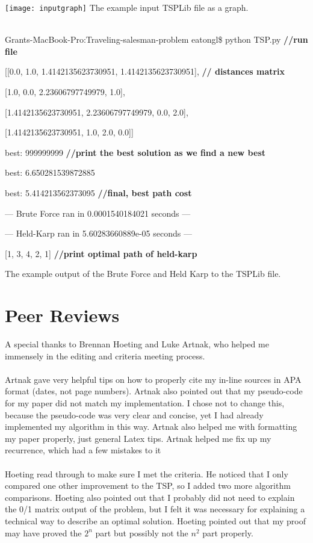 \documentclass[a4paper,titlepage, margin, 11pt]{article}
\numberwithin{equation}{section}
\begin{document}
\begin{appendices}
\begin{center}
\texttt{[image: inputgraph]}
The example input TSPLib file as a graph.
\end{center}


\newpage

\\
Grants-MacBook-Pro:Traveling-salesman-problem eatongl\$ python TSP.py   \textbf{//run file}

[[0.0, 1.0, 1.4142135623730951, 1.4142135623730951], \textbf{// distances matrix}

 [1.0, 0.0, 2.23606797749979, 1.0], 

[1.4142135623730951, 2.23606797749979, 0.0, 2.0], 

[1.4142135623730951, 1.0, 2.0, 0.0]]

best: 999999999 \textbf{//print the best solution as we find a new best}

best: 6.650281539872885

best:  5.414213562373095 \textbf{//final, best path cost}

--- Brute Force ran in 0.0001540184021 seconds ---

--- Held-Karp ran in 5.60283660889e-05 seconds ---

[1, 3, 4, 2, 1] \textbf{//print optimal path of held-karp}

\begin{center}
The example output of the Brute Force and Held Karp to the TSPLib file.
\end{center}


\section{ Peer Reviews}
A special thanks to Brennan Hoeting and Luke Artnak, who helped me immensely in the editing and criteria meeting process.\\\\
Artnak gave very helpful tips on how to properly cite my in-line sources in APA format (dates, not page numbers). Artnak also pointed out that my pseudo-code for my paper did not match my implementation. I chose not to change this, because the pseudo-code was very clear and concise, yet I had already implemented my algorithm in this way. Artnak also helped me with formatting my paper properly, just general Latex tips. Artnak helped me fix up my recurrence, which had a few mistakes to it \\\\
Hoeting read through to make sure I met the criteria. He noticed that I only compared one other improvement to the TSP, so I added two more algorithm comparisons. Hoeting also pointed out that I probably did not need to explain the 0/1 matrix output of the problem, but I felt it was necessary for explaining a technical way to describe an optimal solution. Hoeting pointed out that my proof may have proved the $2^n$ part but possibly not the $n^2$ part properly. \\\


\end{appendices}
\end{document}
